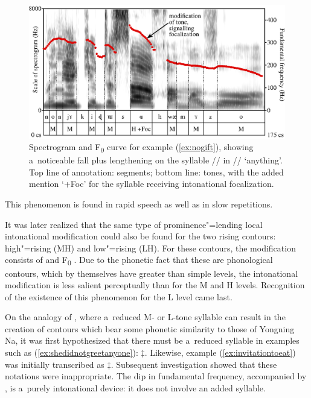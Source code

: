 \begin{figure}[ht]
	\includegraphics[width=\textwidth]{figures/F/F.eps}
	\caption{Spectrogram and F\textsubscript{0} curve for example (\ref{ex:nogift}), showing a~noticeable fall plus {lengthening} on the syllable // in // ‘anything’. Top line of annotation: segments; bottom line: tones, with the added mention ‘+Foc’ for the syllable receiving intonational {focalization}.}
	\label{fig:noneedforbuying}
\end{figure}

This phenomenon is found in rapid speech as well as in slow repetitions.

It was later realized that the same type of prominence"=lending local intonational modification could
also be found for the two rising contours: high"=rising (MH) and low"=rising (LH). For these
contours, the modification consists of  and F\textsubscript{0} . Due to the phonetic fact that these are phonological contours, which by themselves have
greater  than simple levels, the intonational modification is less salient perceptually than for the M
and H levels. Recognition of the existence of this phenomenon for the L level came last.

On the {analogy} of , where a~reduced M- or L-tone syllable can result in the creation of
contours \citep{michaudetal2007d} which bear some phonetic similarity to those of Yongning Na, it was first hypothesized that there must be a~reduced
syllable in examples such as (\ref{ex:shedidnotgreetanyone}): $\ddagger${\kern2pt}. Likewise, example (\ref{ex:invitationtoeat}) was initially transcribed as $\ddagger${\kern2pt}. Subsequent investigation showed that these notations were inappropriate. The dip in
fundamental frequency, accompanied by , is
a~purely intonational device: it does not involve an added syllable.

